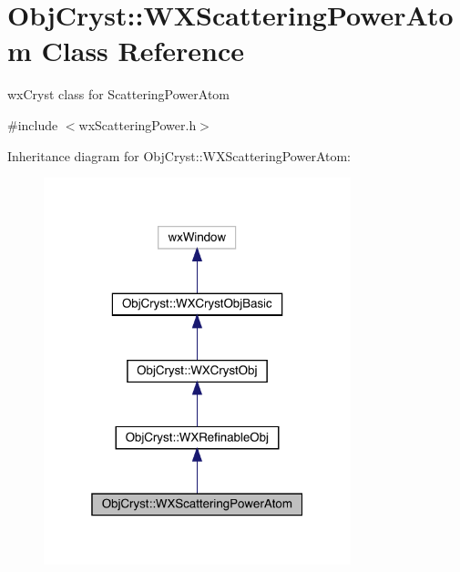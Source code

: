\hypertarget{class_obj_cryst_1_1_w_x_scattering_power_atom}{}\section{Obj\+Cryst\+::W\+X\+Scattering\+Power\+Atom Class Reference}
\label{class_obj_cryst_1_1_w_x_scattering_power_atom}


wx\+Cryst class for Scattering\+Power\+Atom  




{\ttfamily \#include $<$wx\+Scattering\+Power.\+h$>$}



Inheritance diagram for Obj\+Cryst\+::W\+X\+Scattering\+Power\+Atom\+:
\nopagebreak
\begin{figure}[H]
\begin{center}
\leavevmode
\includegraphics[width=253pt]{class_obj_cryst_1_1_w_x_scattering_power_atom__inherit__graph}
\end{center}
\end{figure}


